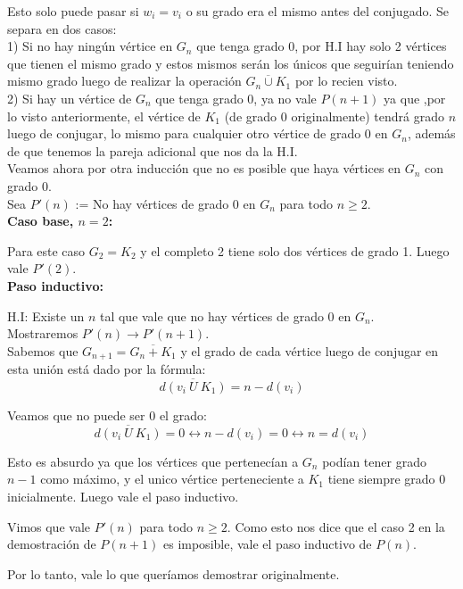 \documentclass{article}
\begin{document}
Esto solo puede pasar si $w_i = v_i$ o su grado era el mismo antes del conjugado. Se separa en dos casos:\\

1) Si no hay ningún vértice en $G_n$ que tenga grado 0, por H.I hay solo 2 vértices que tienen el mismo grado y estos mismos serán los únicos que seguirían teniendo mismo grado luego de realizar la operación $\overline{G_n \cup K_1}$ por lo recien visto. \\

2) Si hay un vértice de $G_n$ que tenga grado 0, ya no vale $P(n + 1)$ ya que ,por lo visto anteriormente, el vértice de $K_1$ (de grado 0 originalmente) tendrá grado $n$ luego de conjugar, lo mismo para cualquier otro vértice de grado 0 en $G_n$, además de que tenemos la pareja adicional que nos da la H.I.\\

Veamos ahora por otra inducción que no es posible que haya vértices en $G_n$ con grado 0.\\

Sea $P'(n)$ := No hay vértices de grado 0 en $G_n$ para todo $n \geq 2$.\\

\textbf{Caso base, $n = 2$:}

Para este caso $G_2 = K_2$ y el completo 2 tiene solo dos vértices de grado 1. Luego vale $P'(2)$.\\

\textbf{Paso inductivo:}

H.I: Existe un $n$ tal que vale que no hay vértices de grado 0 en $G_n$. \\ 
Mostraremos $P'(n) \rightarrow P'(n+1)$.\\

Sabemos que $G_{n+1} = \overline{G_n + K_1}$ y el grado de cada vértice luego de conjugar en esta unión está dado por la fórmula:
\[ \overline{d(v_i \ U\  K_1)} =  n - d(v_i) \]

Veamos que no puede ser 0 el grado:
\[ \overline{d(v_i \ U\  K_1)}  = 0 \leftrightarrow n - d(v_i) = 0 \leftrightarrow n = d(v_i) \]

Esto es absurdo ya que los vértices que pertenecían a $G_n$ podían tener grado $n-1$ como máximo, y el unico vértice  perteneciente a $K_1$ tiene siempre grado 0 inicialmente. Luego vale el paso inductivo.

Vimos que vale $P'(n)$ para todo $n \geq 2$. Como esto nos dice que el caso 2 en la demostración de $P(n+1)$ es imposible, vale el paso inductivo de $P(n)$.

Por lo tanto, vale lo que queríamos demostrar originalmente.
\end{document}

